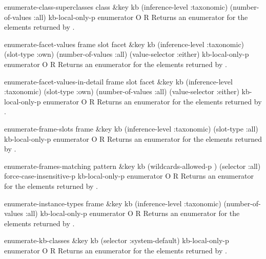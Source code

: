 \begin{okbcop}{enumerate-class-superclasses}{ class \&key kb (inference-level :taxonomic) (number-of-values :all) kb-local-only-p} { enumerator } { O } { R } {  }
Returns an enumerator for the elements returned by 
.
\end{okbcop}

\begin{okbcop}{enumerate-facet-values}{ frame slot facet \&key kb (inference-level :taxonomic) (slot-type :own) (number-of-values :all) (value-selector :either) kb-local-only-p} { enumerator } { O } { R } {  }
Returns an enumerator for the elements returned by 
.
\end{okbcop}

\begin{okbcop}{enumerate-facet-values-in-detail}{ frame slot facet \&key kb (inference-level :taxonomic) (slot-type :own) (number-of-values :all) (value-selector :either) kb-local-only-p} { enumerator } { O } { R } {  }
Returns an enumerator for the elements returned by 
.
\end{okbcop}

\begin{okbcop}{enumerate-frame-slots}{ frame \&key kb (inference-level :taxonomic) (slot-type :all) kb-local-only-p} { enumerator } { O } { R } {  }
Returns an enumerator for the elements returned by 
.
\end{okbcop}

\begin{okbcop}{enumerate-frames-matching}{ pattern \&key kb (wildcards-allowed-p \true) (selector :all) force-case-insensitive-p kb-local-only-p} { enumerator } { O } { R } {  }
Returns an enumerator for the elements returned by 
.
\end{okbcop}

\begin{okbcop}{enumerate-instance-types}{ frame \&key kb (inference-level :taxonomic) (number-of-values :all) kb-local-only-p} { enumerator } { O } { R } {  }
Returns an enumerator for the elements returned by 
.
\end{okbcop}

\begin{okbcop}{enumerate-kb-classes}{ \&key kb (selector :system-default) kb-local-only-p} { enumerator } { O } { R } {  }
Returns an enumerator for the elements returned by 
.
\end{okbcop}

